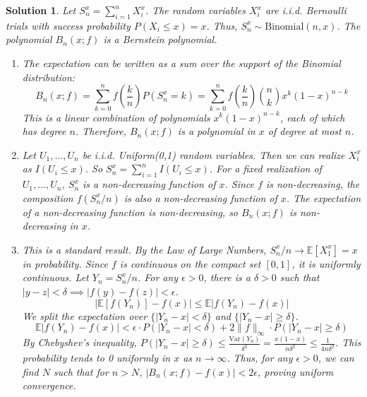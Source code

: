 \documentclass[12pt]{amsart}
\newtheorem*{solution}{Solution}
\begin{document}
\begin{solution}
Let $S_n^x = \sum_{i=1}^n X_i^x$. The random variables $X_i^x$ are i.i.d. Bernoulli trials with success probability $P(X_i \le x) = x$. Thus, $S_n^x \sim \text{Binomial}(n,x)$. The polynomial $B_n(x;f)$ is a Bernstein polynomial.
\begin{enumerate}[label=(\alph*)]
\item The expectation can be written as a sum over the support of the Binomial distribution:
$$ B_n(x;f) = \sum_{k=0}^n f\left(\frac{k}{n}\right) P(S_n^x=k) = \sum_{k=0}^n f\left(\frac{k}{n}\right) \binom{n}{k} x^k (1-x)^{n-k} $$
This is a linear combination of polynomials $x^k(1-x)^{n-k}$, each of which has degree $n$. Therefore, $B_n(x;f)$ is a polynomial in $x$ of degree at most $n$.
\item Let $U_1, \ldots, U_n$ be i.i.d. Uniform(0,1) random variables. Then we can realize $X_i^x$ as $I(U_i \le x)$. So $S_n^x = \sum_{i=1}^n I(U_i \le x)$. For a fixed realization of $U_1, \ldots, U_n$, $S_n^x$ is a non-decreasing function of $x$. Since $f$ is non-decreasing, the composition $f(S_n^x/n)$ is also a non-decreasing function of $x$. The expectation of a non-decreasing function is non-decreasing, so $B_n(x;f)$ is non-decreasing in $x$.
\item This is a standard result. By the Law of Large Numbers, $S_n^x/n \to \mathbb{E}[X_1^x] = x$ in probability. Since $f$ is continuous on the compact set $[0,1]$, it is uniformly continuous.
Let $Y_n = S_n^x/n$. For any $\epsilon > 0$, there is a $\delta > 0$ such that $|y-z|<\delta \implies |f(y)-f(z)|<\epsilon$.
$$ |\mathbb{E}[f(Y_n)] - f(x)| \le \mathbb{E}|f(Y_n) - f(x)| $$
We split the expectation over $\{|Y_n - x| < \delta\}$ and $\{|Y_n - x| \ge \delta\}$.
$$ \mathbb{E}|f(Y_n) - f(x)| < \epsilon \cdot P(|Y_n - x| < \delta) + 2\|f\|_\infty \cdot P(|Y_n - x| \ge \delta) $$
By Chebyshev's inequality, $P(|Y_n - x| \ge \delta) \le \frac{\text{Var}(Y_n)}{\delta^2} = \frac{x(1-x)}{n\delta^2} \le \frac{1}{4n\delta^2}$.
This probability tends to 0 uniformly in $x$ as $n \to \infty$. Thus, for any $\epsilon > 0$, we can find $N$ such that for $n > N$, $|B_n(x;f) - f(x)| < 2\epsilon$, proving uniform convergence.
\end{enumerate}
\end{solution}
\end{document}
